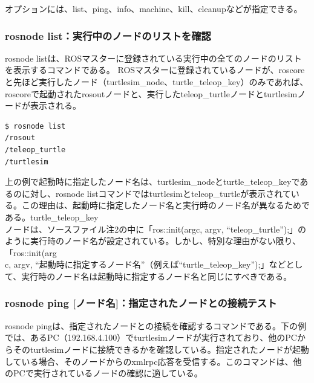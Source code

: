 オプションには、list、ping、info、machine、kill、cleanupなどが指定できる。

\subsubsection{rosnode list：実行中のノードのリストを確認}

rosnode listは、ROSマスターに登録されている実行中の全てのノードのリストを表示するコマンドである。 ROSマスターに登録されているノードが、roscoreと先ほど実行したノード（turtlesim\_node、turtle\_teleop\_key）のみであれば、roscoreで起動されたrosoutノードと、実行したteleop\_turtleノードとturtlesimノードが表示される。

\begin{lstlisting}[language=ROS]
$ rosnode list
/rosout
/teleop_turtle
/turtlesim
\end{lstlisting}

\begin{exercise}[起動時に指定するノード名と実行されたノード名が違う理由]
上の例で起動時に指定したノード名は、turtlesim\_nodeとturtle\_teleop\_keyであるのに対し、rosnode listコマンドではturtlesimとteleop\_turtleが表示されている。この理由は、起動時に指定したノード名と実行時のノード名が異なるためである。turtle\_teleop\_key\\ノードは、ソースファイル注2の中に「ros::init(argc, argv, ``teleop\_turtle'');」のように実行時のノード名が設定されている。しかし、特別な理由がない限り、「ros::init(arg\\c, argv, ``起動時に指定するノード名''（例えば``turtle\_teleop\_key'');」などとして、実行時のノード名は起動時に指定するノード名と同じにすべきである。
\end{exercise}

\subsubsection{rosnode ping [ノード名]：指定されたノードとの接続テスト}

rosnode pingは、指定されたノードとの接続を確認するコマンドである。下の例では、あるPC（192.168.4.100）でturtlesimノードが実行されており、他のPCからそのturtlesimノードに接続できるかを確認している。指定されたノードが起動している場合、そのノードからのxmlrpc応答を受信する。このコマンドは、他のPCで実行されているノードの確認に適している。

